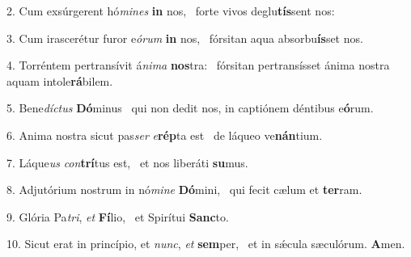 2. Cum exsúrgerent hó\textit{mi}\textit{nes} \textbf{in} nos, \ast\  forte vivos deglu\textbf{tís}sent nos:\

3. Cum irascerétur furor e\textit{ó}\textit{rum} \textbf{in} nos, \ast\  fórsitan aqua absorbu\textbf{ís}set nos.\

4. Torréntem pertransívit á\textit{ni}\textit{ma} \textbf{nos}tra: \ast\  fórsitan pertransísset ánima nostra aquam intole\textbf{rá}bilem.\

5. Bene\textit{díc}\textit{tus} \textbf{Dó}minus \ast\  qui non dedit nos, in captiónem déntibus e\textbf{ó}rum.\

6. Anima nostra sicut pas\textit{ser} \textit{e}\textbf{rép}ta est \ast\  de láqueo ve\textbf{nán}tium.\

7. Láque\textit{us} \textit{con}\textbf{trí}tus est, \ast\  et nos liberáti \textbf{su}mus.\

8. Adjutórium nostrum in nó\textit{mi}\textit{ne} \textbf{Dó}mini, \ast\  qui fecit cælum et \textbf{ter}ram.\

9. Glória Pa\textit{tri}, \textit{et} \textbf{Fí}lio, \ast\  et Spirítui \textbf{Sanc}to.\

10. Sicut erat in princípio, et \textit{nunc}, \textit{et} \textbf{sem}per, \ast\  et in sǽcula sæculórum. \textbf{A}men.\

